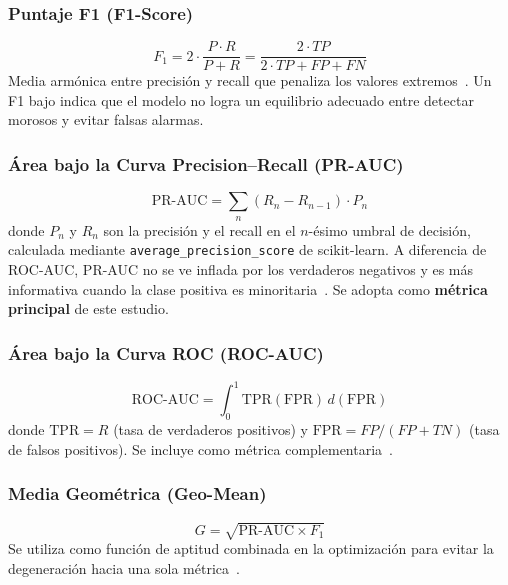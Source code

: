\documentclass[journal]{IEEEtran}
\begin{document}
\subsubsection{Puntaje F1 (F1-Score)}
\begin{equation}
    F_1 = 2 \cdot \frac{P \cdot R}{P + R} = \frac{2 \cdot TP}{2 \cdot TP + FP + FN}
    \label{eq:f1}
\end{equation}
Media armónica entre precisión y recall que penaliza los valores extremos~\cite{powers2011}. Un F1 bajo indica que el modelo no logra un equilibrio adecuado entre detectar morosos y evitar falsas alarmas.

\subsubsection{Área bajo la Curva Precision--Recall (PR-AUC)}
\begin{equation}
    \text{PR-AUC} = \sum_{n} (R_n - R_{n-1}) \cdot P_n
    \label{eq:prauc}
\end{equation}
donde $P_n$ y $R_n$ son la precisión y el recall en el $n$-ésimo umbral de decisión, calculada mediante \texttt{average\_precision\_score} de scikit-learn. A diferencia de ROC-AUC, PR-AUC no se ve inflada por los verdaderos negativos y es más informativa cuando la clase positiva es minoritaria~\cite{davis2006, saito2015}. Se adopta como \textbf{métrica principal} de este estudio.

\subsubsection{Área bajo la Curva ROC (ROC-AUC)}
\begin{equation}
    \text{ROC-AUC} = \int_0^1 \text{TPR}(\text{FPR}) \, d(\text{FPR})
    \label{eq:rocauc}
\end{equation}
donde $\text{TPR} = R$ (tasa de verdaderos positivos) y $\text{FPR} = FP/(FP+TN)$ (tasa de falsos positivos). Se incluye como métrica complementaria~\cite{fawcett2006}.

\subsubsection{Media Geométrica (Geo-Mean)}
\begin{equation}
    G = \sqrt{\text{PR-AUC} \times F_1}
    \label{eq:geomean}
\end{equation}
Se utiliza como función de aptitud combinada en la optimización para evitar la degeneración hacia una sola métrica~\cite{he2009}.
\end{document}
